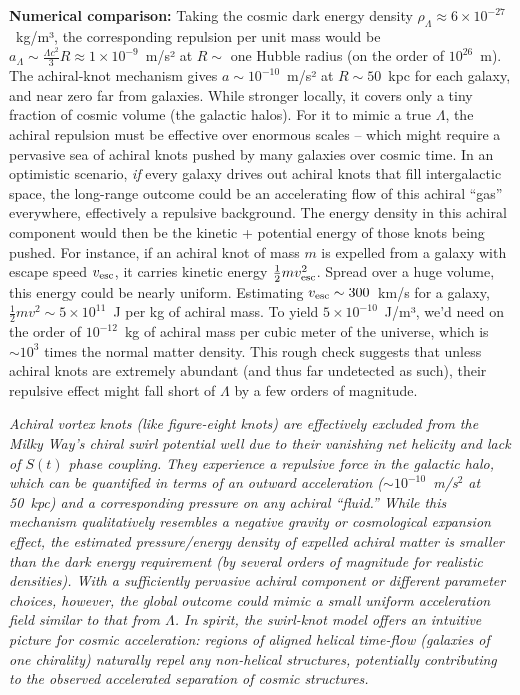 \documentclass[11pt]{article}
\begin{document}
\textbf{Numerical comparison:} Taking the cosmic dark energy density $\rho_\Lambda \approx 6\times10^{-27}$~kg/m³, the corresponding repulsion per unit mass would be $a_\Lambda \sim \frac{\Lambda c^2}{3} R \approx 1\times10^{-9}$~m/s² at $R\sim$ one Hubble radius (on the order of $10^{26}$~m). The achiral-knot mechanism gives $a \sim10^{-10}$~m/s² at $R\sim50$~kpc for each galaxy, and near zero far from galaxies. While stronger locally, it covers only a tiny fraction of cosmic volume (the galactic halos). For it to mimic a true $\Lambda$, the achiral repulsion must be effective over enormous scales – which might require a pervasive sea of achiral knots pushed by many galaxies over cosmic time. In an optimistic scenario, \textit{if} every galaxy drives out achiral knots that fill intergalactic space, the long-range outcome could be an accelerating flow of this achiral “gas” everywhere, effectively a repulsive background. The energy density in this achiral component would then be the kinetic + potential energy of those knots being pushed. For instance, if an achiral knot of mass $m$ is expelled from a galaxy with escape speed $v_{\rm esc}$, it carries kinetic energy $\frac{1}{2}mv_{\rm esc}^2$. Spread over a huge volume, this energy could be nearly uniform. Estimating $v_{\rm esc}\sim 300$~km/s for a galaxy, $\frac{1}{2}m v^2 \sim 5\times10^{11}$~J per kg of achiral mass. To yield $5\times10^{-10}$~J/m³, we’d need on the order of $10^{-12}$~kg of achiral mass per cubic meter of the universe, which is $\sim10^3$ times the normal matter density. This rough check suggests that unless achiral knots are extremely abundant (and thus far undetected as such), their repulsive effect might fall short of $\Lambda$ by a few orders of magnitude.

\medskip

\textit{Achiral vortex knots (like figure-eight knots) are effectively excluded from the Milky Way’s chiral swirl potential well due to their vanishing net helicity and lack of $S(t)$ phase coupling. They experience a repulsive force in the galactic halo, which can be quantified in terms of an outward acceleration ($\sim 10^{-10}$~m/s$^2$ at 50~kpc) and a corresponding pressure on any achiral “fluid.” While this mechanism qualitatively resembles a negative gravity or cosmological expansion effect, the estimated pressure/energy density of expelled achiral matter is smaller than the dark energy requirement (by several orders of magnitude for realistic densities). With a sufficiently pervasive achiral component or different parameter choices, however, the global outcome could mimic a small uniform acceleration field similar to that from $\Lambda$. In spirit, the swirl-knot model offers an intuitive picture for cosmic acceleration: regions of aligned helical time-flow (galaxies of one chirality) naturally repel any non-helical structures, potentially contributing to the observed accelerated separation of cosmic structures.}
\end{document}

